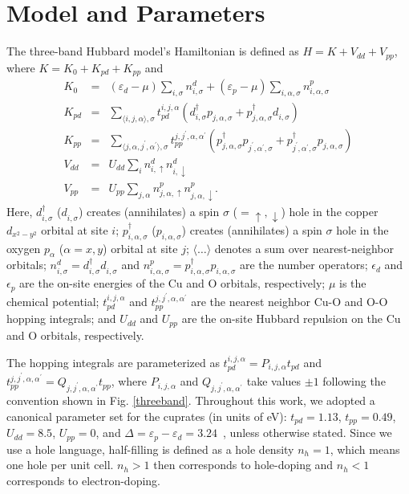 \documentclass[reprint,nofootinbib,nobibnotes,amsmath,amssymb,aps,prb,floatfix]{revtex4-1}
\newcommand{\pdag}{{\phantom\dagger}}
\newcommand{\V}{{\mathcal V}}
\newcommand{\figdisp}[1]{Fig. \ref{#1}}
\begin{document}
\section{Model and Parameters}

The three-band Hubbard model's Hamiltonian is defined 
as $H=K+V_{dd}+V_{pp}$, where $K=K_0+K_{pd}+K_{pp}$ and 
\begin{eqnarray}\nonumber
K_0&=&(\varepsilon_d-\mu)\sum_{i,\sigma}n_{i,\sigma}^d+ (\varepsilon_p-\mu)\sum_{i,\alpha,\sigma} n^p_{i,\alpha,\sigma} \\\nonumber
K_{pd}&=&\sum_{\langle  i,j,\alpha\rangle,\sigma}t^{i,j,\alpha}_{pd}(d^\dagger_{i,\sigma}p^\pdag_{j,\alpha,\sigma}+p^\dagger_{j,\alpha,\sigma}d^\pdag_{i,\sigma})
\\\nonumber
K_{pp}&=&\sum_{\langle j,\alpha,j^\prime,\alpha^\prime \rangle,\sigma} t^{j,j^\prime,\alpha,\alpha^\prime}_{pp}(p^\dagger_{j,\alpha,\sigma}p^\pdag_{j^\prime,\alpha^\prime,\sigma}+p^\dagger_{j^\prime,\alpha^\prime,\sigma}p^\pdag_{j,\alpha,\sigma})
\\\nonumber V_{dd}&=&U_{dd} \sum_i n^d_{i,\uparrow}n^d_{i,\downarrow}
\\V_{pp}&=&U_{pp} \sum_{j,\alpha} n^p_{j,\alpha,\uparrow}n^p_{j,\alpha,\downarrow}.
\end{eqnarray}
Here, $d^\dagger_{i,\sigma}$ ($d^\pdag_{i,\sigma}$) creates (annihilates) a spin $\sigma$ ($=\uparrow,\downarrow$) hole in the copper $d_{x^2-y^2}$ orbital at site $i$;  $p^\dagger_{i,\alpha,\sigma}$ ($p^\pdag_{i,\alpha,\sigma}$) creates (annihilates) a spin  $\sigma$ hole in the oxygen $p_\alpha$ ($\alpha = x,y$) orbital at site $j$; $\langle \dots \rangle$ denotes a sum over nearest-neighbor orbitals; $n^d_{i,\sigma}=d^\dagger_{i,\sigma}d^\pdag_{i,\sigma}$ and 
$n^p_{i,\alpha,\sigma}=p^\dagger_{i,\alpha,\sigma}p^\pdag_{i,\alpha,\sigma}$ are the number operators; 
$\epsilon_d$ and $\epsilon_p$ are the on-site energies of the Cu and O orbitals, respectively; $\mu$ is the chemical potential; $t^{i,j,\alpha}_{pd}$ and $t^{j,j^\prime,\alpha,\alpha^\prime}_{pp}$ are the nearest neighbor Cu-O and O-O hopping integrals; and $U_{dd}$ and $U_{pp}$ are the on-site Hubbard repulsion on the Cu and O orbitals, respectively. 

The hopping integrals are parameterized as $t^{i,j,\alpha}_{pd} = P_{i,j,\alpha}t_{pd}$ and $t^{j,j^\prime,\alpha,\alpha^\prime}_{pp} =  Q_{j,j^\prime,\alpha,\alpha^\prime} t_{pp}$, where $P_{i,j,\alpha}$ and $Q_{j,j^\prime,\alpha,\alpha^\prime}$ take values $\pm 1$ following the convention shown in \figdisp{threeband}. Throughout this work, we adopted a canonical parameter set for the cuprates (in units of eV): $t_{pd} = 1.13$, $t_{pp} = 0.49$, $U_{dd} = 8.5$, $U_{pp} = 0$, and $\Delta = \varepsilon_p -\varepsilon_d = 3.24$~\cite{Kung, Czyzyk, Johnston, Ohta}, unless otherwise stated. Since we use a hole language,  half-filling is defined as a hole density $n_h =1$, which means one hole per unit cell. $n_h>1$ then corresponds to hole-doping and $n_h<1$ corresponds to electron-doping.
\end{document}
